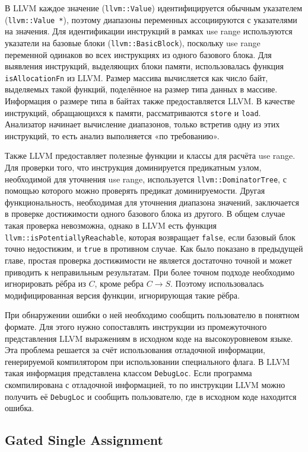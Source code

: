 В LLVM каждое значение (\texttt{llvm::Value}) идентифицируется обычным
указателем (\texttt{llvm::Value *}), поэтому диапазоны переменных
ассоциируются с указателями на значения. Для идентификации инструкций
в рамках use range используются указатели на базовые блоки
(\texttt{llvm::BasicBlock}), поскольку use range переменной одинаков
во всех инструкциях из одного базового блока. Для выявления
инструкций, выделяющих блоки памяти, использовалась функция
\texttt{isAllocationFn} из LLVM. Размер массива вычисляется как число
байт, выделяемых такой функций, поделённое на размер типа данных в
массиве. Информация о размере типа в байтах также предоставляется
LLVM. В качестве инструкций, обращающихся к памяти, рассматриваются
\texttt{store} и \texttt{load}. Анализатор начинает вычисление
диапазонов, только встретив одну из этих инструкций, то есть анализ
выполняется «по требованию».

Также LLVM предоставляет полезные функции и классы для расчёта use
range. Для проверки того, что инструкция доминируется предикатным
узлом, необходимой для уточнения use range, используется
\texttt{llvm::DominatorTree}, с помощью которого можно проверять
предикат доминируемости. Другая функциональность, необходимая для
уточнения диапазона значений, заключается в проверке достижимости
одного базового блока из другого. В общем случае такая проверка
невозможна, однако в LLVM есть функция
\texttt{llvm::isPotentiallyReachable}, которая возвращает
\texttt{false}, если базовый блок точно недостижим, и \texttt{true} в
противном случае. Как было показано в предыдущей главе, простая
проверка достижимости не является достаточно точной и может приводить
к неправильным результатам. При более точном подходе необходимо
игнорировать рёбра из $C$, кроме ребра $C \rightarrow S$. Поэтому
использовалась модифицированная версия функции, игнорирующая такие
рёбра.

При обнаружении ошибки о ней необходимо сообщить пользователю в
понятном формате. Для этого нужно сопоставлять инструкции из
промежуточного представления LLVM выражениям в исходном коде на
высокоуровневом языке. Эта проблема решается за счёт использования
отладочной информации, генерируемой компилятором при использовании
специального флага. В LLVM такая информация представлена классом
\texttt{DebugLoc}. Если программа скомпилирована с отладочной информацией, то
по инструкции LLVM можно получить её \texttt{DebugLoc} и сообщить
пользователю, где в исходном коде находится ошибка.

\subsection{Gated Single Assignment}

